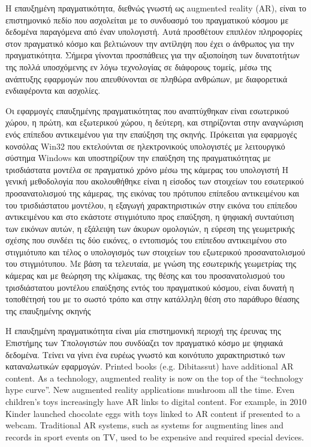 Η επαυξημένη πραγματικότητα, διεθνώς γνωστή ως augmented reality (AR), είναι το επιστημονικό πεδίο που ασχολείται με το συνδυασμό του πραγματικού κόσμου με δεδομένα παραγόμενα από έναν υπολογιστή. Αυτά προσθέτουν επιπλέον πληροφορίες στον πραγματικό κόσμο και βελτιώνουν την αντίληψη που έχει ο άνθρωπος για την πραγματικότητα. Σήμερα γίνονται προσπάθειες για την αξιοποίηση των δυνατοτήτων της πολλά υποσχόμενης εν λόγω τεχνολογίας σε διάφορους τομείς, μέσω της ανάπτυξης εφαρμογών που απευθύνονται σε πληθώρα ανθρώπων, με διαφορετικά ενδιαφέροντα και ασχολίες. 

Οι εφαρμογές επαυξημένης πραγματικότητας που αναπτύχθηκαν είναι εσωτερικού χώρου, η πρώτη, και εξωτερικού χώρου, η δεύτερη, και στηρίζονται στην αναγνώριση ενός επίπεδου αντικειμένου για την επαύξηση της σκηνής. Πρόκειται για εφαρμογές κονσόλας Win32 που εκτελούνται σε ηλεκτρονικούς υπολογιστές με λειτουργικό σύστημα Windows και υποστηρίζουν την επαύξηση της πραγματικότητας με τρισδιάστατα μοντέλα σε πραγματικό χρόνο μέσω της κάμερας του υπολογιστή Η γενική μεθοδολογία που ακολουθήθηκε είναι η είσοδος των στοιχείων του εσωτερικού προσανατολισμού της κάμερας, της εικόνας του πρότυπου επίπεδου αντικειμένου και του τρισδιάστατου μοντέλου, η εξαγωγή χαρακτηριστικών στην εικόνα του επίπεδου αντικειμένου και στο εκάστοτε στιγμιότυπο προς επαύξηση, η ψηφιακή συνταύτιση των εικόνων αυτών, η εξάλειψη των άκυρων ομολογιών, η εύρεση της γεωμετρικής σχέσης που συνδέει τις δύο εικόνες, ο εντοπισμός του επίπεδου αντικειμένου στο στιγμιότυπο και τέλος ο υπολογισμός των στοιχείων του εξωτερικού προσανατολισμού του στιγμιότυπου. Με βάση τα τελευταία, με γνώση της εσωτερικής γεωμετρίας της κάμερας και με θεώρηση της κλίμακας, της θέσης και του προσανατολισμού του τρισδιάστατου μοντέλου επαύξησης εντός του πραγματικού κόσμου, είναι δυνατή η τοποθέτησή του με το σωστό τρόπο και στην κατάλληλη θέση στο παράθυρο θέασης της επαυξημένης σκηνής
%

Η επαυξημένη πραγματικότητα είναι μία επιστημονική περιοχή της έρευνας της Επιστήμης των Υπολογιστών που συνδύαζει τον πραγματικό κόσμο με ψηφιακά δεδομένα. Τείνει να γίνει ένα ευρέως γνωστό και κοινότυπο χαρακτηριστικό  των καταναλωτικών εφαρμογών. Printed books (e.g. Dibitassut) have additional AR content. As a technology, augmented reality is now on the top of the “technology hype curve”. New augmented reality applications mushroom all the time. Even children’s toys increasingly have AR links to digital content. For example, in 2010 Kinder launched chocolate eggs with toys linked to AR content if presented to a webcam. Traditional AR systems, such as systems for augmenting lines and records in sport events on TV, used to be expensive and required special devices. 

